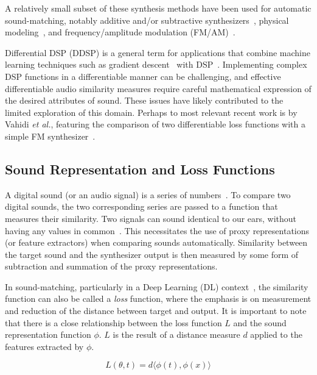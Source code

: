 \documentclass[lettersize,journal]{IEEEtran}
\providecommand{\gls}[1]{#1}
\begin{document}
A relatively small subset of these synthesis methods have been used for automatic sound-matching, notably additive and/or subtractive synthesizers~\cite{esling2019flow,yee2018automatic,mitchell2007evolutionary,salimi2020make}, physical modeling~\cite{riionheimo2003parameter}, and frequency/amplitude modulation (\gls{FM}/\gls{AM})~\cite{horner1993machine,vahidi2023mesostructures}. 

Differential DSP (\gls{DDSP}) is a general term for applications that combine machine learning techniques such as gradient descent~\cite{goodfellow2016deep,boyd2004convex} with DSP~\cite{engel2020ddsp}. Implementing complex DSP functions in a differentiable manner can be challenging, and effective differentiable audio similarity measures require careful mathematical expression of the desired attributes of sound. These issues have likely contributed to the limited exploration of this domain. Perhaps to most relevant recent work is by Vahidi \textit{et al.}, featuring the comparison of two differentiable loss functions with a simple FM synthesizer~\cite{vahidi2023mesostructures}. 

\subsection{Sound Representation and Loss Functions}
\label{sec:loss_funcs}
A digital sound (or an audio signal) is a series of numbers~\cite{smith1991viewpoints,smith2007mathematics}. To compare two digital sounds, the two corresponding series are passed to a function that measures their similarity. Two signals can sound identical to our ears, without having any values in common~\cite{moore2012introduction}. This necessitates the use of proxy representations (or feature extractors) when comparing sounds automatically. Similarity between the target sound and the synthesizer output is then measured by some form of subtraction and summation of the proxy representations.

In sound-matching, particularly in a Deep Learning (\gls{DL}) context~\cite{goodfellow2016deep}, the similarity function can also be called a \textit{loss} function, where the emphasis is on measurement and reduction of the distance between target and output. It is important to note that there is a close relationship between the loss function $L$ and the sound representation function $\phi$. $L$ is the result of a distance measure $d$ applied to the features extracted by $\phi$. 

\[
L(\theta, t) = d\langle\phi(t),\phi(x)\rangle
\]
\end{document}
